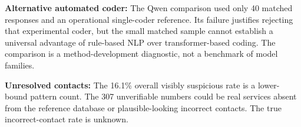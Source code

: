 \textbf{Alternative automated coder:} The Qwen comparison used only 40 matched responses and an operational single-coder reference. Its failure justifies rejecting that experimental coder, but the small matched sample cannot establish a universal advantage of rule-based NLP over transformer-based coding. The comparison is a method-development diagnostic, not a benchmark of model families.

\textbf{Unresolved contacts:} The 16.1\% overall visibly suspicious rate is a lower-bound pattern count. The 307 unverifiable numbers could be real services absent from the reference database or plausible-looking incorrect contacts. The true incorrect-contact rate is unknown.
